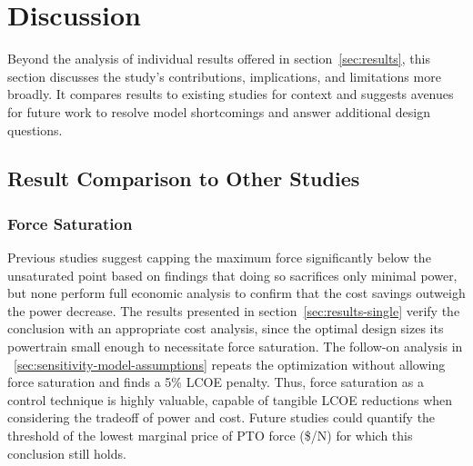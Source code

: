 \section{Discussion}\label{sec:discussion}

Beyond the analysis of individual results offered in section~\ref{sec:results}, this section discusses the study's contributions, implications, and limitations more broadly.
It compares results to existing studies for context and suggests avenues for future work to resolve model shortcomings and answer additional design questions.

\subsection{Result Comparison to Other Studies }
\subsubsection{Force Saturation}
Previous studies \cite{mcgilton_optimal_2024,coe_maybe_2021,devin_high-dimensional_2024,gaebele_tpl_2025,mccabe_force-limited_2024} suggest capping the maximum force significantly below the unsaturated point based on findings that doing so sacrifices only minimal power, but none perform full economic analysis to confirm that the cost savings outweigh the power decrease.
The results presented in section~\ref{sec:results-single} verify the conclusion with an appropriate cost analysis, since the optimal design sizes its powertrain small enough to necessitate force saturation.
The follow-on analysis in \sectionautorefname~\ref{sec:sensitivity-model-assumptions} repeats the optimization without allowing force saturation and finds a 5\% LCOE penalty.
Thus, force saturation as a control technique is highly valuable, capable of tangible LCOE reductions when considering the tradeoff of power and cost.
Future studies could quantify the threshold of the lowest marginal price of PTO force (\$/N) for which this conclusion still holds.


